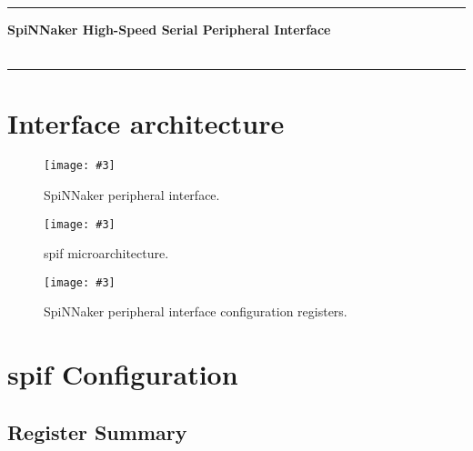 \documentclass[11pt,a4paper,twoside]{article}
\newcommand{\image}[5][]
{
\begin{figure}[#2]
   \begin{center}
      \texttt{[image: \#3]}
      \caption{#5}
      \label{fig:#4}
   \end{center}
\end{figure}
}
\begin{document}
\rule{\linewidth}{2pt}

\begin{center}
	\textbf{
		\Large{SpiNNaker High-Speed Serial Peripheral Interface} \\
		\vspace*{0.5cm}
		\large {\myversion} \\
		\large{\mydate}
	}
\end{center}

\rule{\linewidth}{2pt}

\vspace*{1.0cm}


\section{Interface architecture}

\image[width = \textwidth]{!h}{spin_per_if}{fig:spin_if}
	{SpiNNaker peripheral interface.}


\image[width = \textwidth]{!h}{spif_bd}{fig:spif_bd}
{spif microarchitecture.}


\image[width = 0.9 \textwidth]{!h}{spif_cf}{fig:spif_cf}
{SpiNNaker peripheral interface configuration registers.}

\clearpage
 
\section{spif Configuration}


\subsection{Register Summary}
\end{document}
